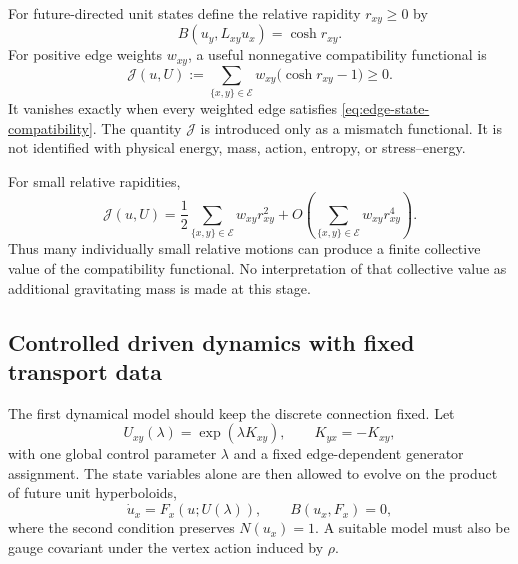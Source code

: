 \documentclass[11pt,a4paper]{article}
\theoremstyle{remark}
\begin{document}
For future-directed unit states define the relative rapidity \(r_{xy}\ge0\) by
\begin{equation}
  B\!\left(u_y,L_{xy}u_x\right)=\cosh r_{xy}.
\tag{5.13}\label{eq:relative-rapidity-graph}
\end{equation}
For positive edge weights \(w_{xy}\), a useful nonnegative compatibility functional is
\begin{equation}
  \mathcal J(u,U)
  :=\sum_{\{x,y\}\in\mathcal E}
  w_{xy}\bigl(\cosh r_{xy}-1\bigr)\ge0.
\tag{5.14}\label{eq:compatibility-functional}
\end{equation}
It vanishes exactly when every weighted edge satisfies \eqref{eq:edge-state-compatibility}.  The quantity \(\mathcal J\) is introduced only as a mismatch functional.  It is not identified with physical energy, mass, action, entropy, or stress--energy.

For small relative rapidities,
\begin{equation}
  \mathcal J(u,U)
  =\frac12\sum_{\{x,y\}\in\mathcal E}w_{xy}r_{xy}^2
   +O\!\left(\sum_{\{x,y\}\in\mathcal E}w_{xy}r_{xy}^4\right).
\tag{5.15}\label{eq:small-rapidity-functional}
\end{equation}
Thus many individually small relative motions can produce a finite collective value of the compatibility functional.  No interpretation of that collective value as additional gravitating mass is made at this stage.

\subsection{Controlled driven dynamics with fixed transport data}

The first dynamical model should keep the discrete connection fixed.  Let
\begin{equation}
  U_{xy}(\lambda)
  =\exp\!\left(\lambda K_{xy}\right),
  \qquad
  K_{yx}=-K_{xy},
\tag{5.16}\label{eq:driven-link-family}
\end{equation}
with one global control parameter \(\lambda\) and a fixed edge-dependent generator assignment.  The state variables alone are then allowed to evolve on the product of future unit hyperboloids,
\begin{equation}
  \dot u_x=F_x(u;U(\lambda)),
  \qquad
  B(u_x,F_x)=0,
\tag{5.17}\label{eq:fixed-link-state-flow}
\end{equation}
where the second condition preserves \(N(u_x)=1\).  A suitable model must also be gauge covariant under the vertex action induced by \(\rho\).
\end{document}
